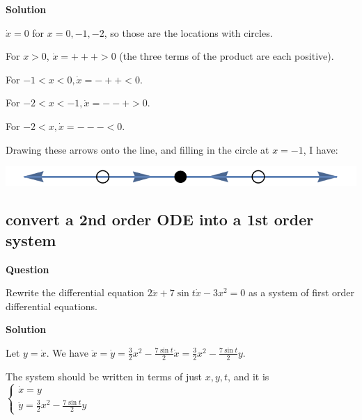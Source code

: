 \documentclass[12pt,letterpaper,noanswers]{exam}
\begin{document}
\noindent\textbf{Solution}


$\dot x = 0$ for $x = 0, -1, -2$, so those are the locations with circles.

For $x > 0$, $\dot x = + + + > 0$ (the three terms of the product are each positive).

For $-1 < x < 0, \dot x = - + + < 0$.

For $-2 < x < -1, \dot x = - - + > 0$.

For $-2 < x, \dot x = - - - < 0$.

Drawing these arrows onto the line, and filling in the circle at $x = -1$, I have:

\includegraphics{img/C34skillex.pdf}

\subsection{convert a 2nd order ODE into a 1st order system}
\noindent\textbf{Question}

Rewrite the differential equation $2\ddot x + 7\sin t\dot x - 3x^2 = 0$ as a system of first order differential equations. 


\noindent\textbf{Solution}

Let $ y = \dot x$.  We have $\ddot x = \dot y = \frac{3}{2}x ^2- \frac{7\sin t}{2}\dot x = \frac{3}{2}x ^2- \frac{7\sin t}{2}y$.

The system should be written in terms of just $x,y,t$, and it is
$\displaystyle\left\{\begin{array}{l} \dot x = y \\ \dot y = \frac{3}{2}x^2 - \frac{7\sin t}{2}y
\end{array}\right.$
\end{document}
